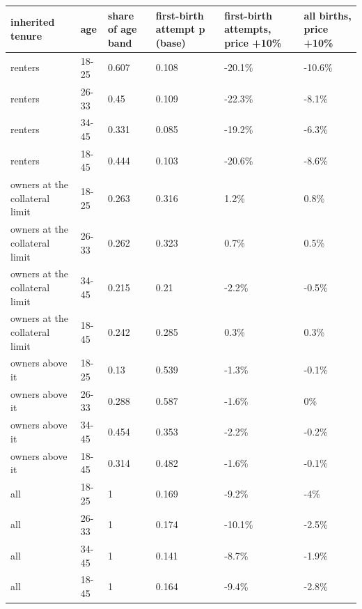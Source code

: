 \begingroup\small
\setlength{\tabcolsep}{3pt}
\renewcommand{\arraystretch}{1.04}
\begin{tabularx}{\linewidth}{XXXXXX}
\toprule
inherited tenure & age & share of age band & first-birth attempt p (base) & first-birth attempts, price +10\% & all births, price +10\% \\
\midrule
renters & 18-25 & 0.607 & 0.108 & -20.1\% & -10.6\% \\
renters & 26-33 & 0.45 & 0.109 & -22.3\% & -8.1\% \\
renters & 34-45 & 0.331 & 0.085 & -19.2\% & -6.3\% \\
renters & 18-45 & 0.444 & 0.103 & -20.6\% & -8.6\% \\
owners at the collateral limit & 18-25 & 0.263 & 0.316 & 1.2\% & 0.8\% \\
owners at the collateral limit & 26-33 & 0.262 & 0.323 & 0.7\% & 0.5\% \\
owners at the collateral limit & 34-45 & 0.215 & 0.21 & -2.2\% & -0.5\% \\
owners at the collateral limit & 18-45 & 0.242 & 0.285 & 0.3\% & 0.3\% \\
owners above it & 18-25 & 0.13 & 0.539 & -1.3\% & -0.1\% \\
owners above it & 26-33 & 0.288 & 0.587 & -1.6\% & 0\% \\
owners above it & 34-45 & 0.454 & 0.353 & -2.2\% & -0.2\% \\
owners above it & 18-45 & 0.314 & 0.482 & -1.6\% & -0.1\% \\
all & 18-25 & 1 & 0.169 & -9.2\% & -4\% \\
all & 26-33 & 1 & 0.174 & -10.1\% & -2.5\% \\
all & 34-45 & 1 & 0.141 & -8.7\% & -1.9\% \\
all & 18-45 & 1 & 0.164 & -9.4\% & -2.8\% \\
\bottomrule
\end{tabularx}
\endgroup
